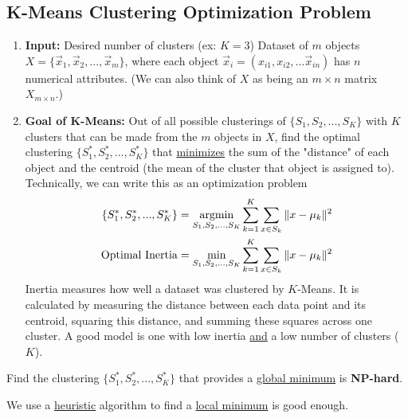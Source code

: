 \documentclass[11pt]{elegantbook}
\newcommand{\argmin}{\operatornamewithlimits{argmin}}
\begin{document}
\subsection{K-Means Clustering Optimization Problem}
\begin{enumerate}
    \item \textbf{Input:}
    \subitem Desired number of clusters (ex: $K=3$)
    \subitem Dataset of $m$ objects $X=\{\vec{x}_1,\vec{x}_2,...,\vec{x}_m\}$, where each object $\vec{x}_i=(x_{i1},x_{i2},...\vec{x}_{in})$ has $n$ numerical attributes. (We can also think of $X$ as being an $m\times n$ matrix $X_{m\times n}$.)
    \item \textbf{Goal of K-Means:}
    \subitem Out of all possible clusterings of $\{S_1 ,S_2 , ... , S_K\}$ with $K$ clusters that can be made from the $m$ objects in $X$, find the optimal clustering $\{S_1^*,S_2^*,...,S_K^*\}$ that \underline{minimizes} the sum of the "distance" of each object and the centroid (the mean of the cluster that object is assigned to).
    \subitem Technically, we can write this as an optimization problem
    \begin{equation}
        \begin{aligned}
            \{S_1^*,S_2^*,...,S_K^*\}=\argmin_{S_1,S_2,...,S_K}\sum_{k=1}^K\sum_{x\in S_k}\|x-\mu_k\|^2\\
            \textnormal{Optimal Inertia}=\min_{S_1,S_2,...,S_K}\sum_{k=1}^K\sum_{x\in S_k}\|x-\mu_k\|^2\\
        \end{aligned}
        \nonumber
    \end{equation}
    Inertia measures how well a dataset was clustered by $K$-Means. It is calculated by measuring the distance between each data point and its centroid, squaring this distance, and summing these squares across one cluster. A good model is one with low inertia \underline{and} a low number of clusters ($K$).
\end{enumerate}
Find the clustering $\{S_1^*,S_2^*,...,S_K^*\}$ that provides a \underline{global minimum} is \textbf{NP-hard}.

We use a \underline{heuristic} algorithm to find a \underline{local minimum} is good enough.
\end{document}
